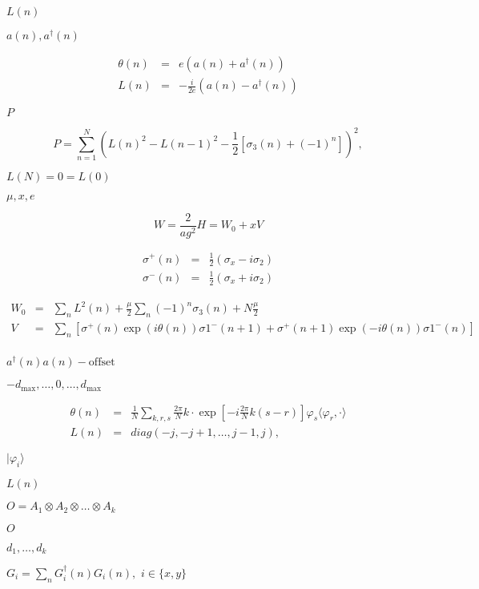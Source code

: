 \documentclass{article}
\begin{document}
{$ L(n)$
\pagebreak

$ a(n), a^\dagger(n) $
\pagebreak

\begin{eqnarray*}
   \theta(n) &=& e\left(a(n)+a^\dagger(n)\right)\\
   L(n) &=& -\frac{i}{2e}\left(a(n) - a^\dagger(n)\right)
 \end{eqnarray*}
\pagebreak

$ P $
\pagebreak

\[ P=\sum_{n=1}^N\left(L(n)^2 - L(n-1)^2 -\frac{1}{2}\left[\sigma_3(n)+(-1)^n\right]\right)^2, \]
\pagebreak

$ L(N) = 0 = L(0) $
\pagebreak

$ \mu, x, e $
\pagebreak

\[ W =\frac{2}{ag^2} H = W_0+xV \]
\pagebreak

\begin{eqnarray*}
   \sigma^+(n) &=& \frac{1}{2}(\sigma_x - i\sigma_2) \\ 
   \sigma^-(n) &=& \frac{1}{2}(\sigma_x + i\sigma_2)
  \end{eqnarray*}
\pagebreak

\begin{eqnarray*} 
  W_0 &=& \sum_n L^2(n) + \frac{\mu}{2}\sum_n(-1)^n\sigma_3(n)+N\frac{\mu}{2}\\
  V &=& \sum_n\left[\sigma^+(n)\exp(i\theta(n))\sigma1^-(n+1) + \sigma^+(n+1)\exp(-i\theta(n))\sigma1^-(n)\right] \\
 \end{eqnarray*}
\pagebreak

$ a^\dagger(n)a(n) -\mathrm{offset}$
\pagebreak

$ -d_\mathrm{max},\dots,0,\dots,d_\mathrm{max} $
\pagebreak

\begin{eqnarray*}
   \theta(n) &=& \frac{1}{N}\sum_{k,r,s}\frac{2\pi}{N}k\cdot\exp\left[-i\frac{2\pi}{N}k(s-r)\right]\varphi_s\langle\varphi_r,\cdot\rangle \\
   L(n) &=& diag(-j,-j+1,\dots,j-1,j),
 \end{eqnarray*}
\pagebreak

$ |\varphi_i\rangle $
\pagebreak

$ L(n) $
\pagebreak

$ O= A_1\otimes A_2 \otimes \dots \otimes A_k $
\pagebreak

$ O $
\pagebreak

$ d_1,\dots,d_k $
\pagebreak

$ G_i=\sum_nG^\dagger_i(n)G_i(n),\,\, i\in\{x,y\}$
\pagebreak

}
\end{document}
